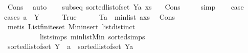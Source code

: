 \begin{isabellebody}
\ Cons{\isacharparenleft}{\kern0pt}{}{\isacharparenright}{\kern0pt}\ \isamarkupfalse%
\ auto\isanewline
\ \ \isamarkupfalse%
\ {}{\isacharcolon}{\kern0pt}{\isachardoublequoteopen}subseq\ {\isacharparenleft}{\kern0pt}sorted{\isacharunderscore}{\kern0pt}list{\isacharunderscore}{\kern0pt}of{\isacharunderscore}{\kern0pt}set\ {\isacharparenleft}{\kern0pt}Y{\isacharminus}{\kern0pt}{\isacharbraceleft}{\kern0pt}a{\isacharbraceright}{\kern0pt}{\isacharparenright}{\kern0pt}{\isacharparenright}{\kern0pt}\ xs{\isachardoublequoteclose}\ \ \isamarkupfalse%
\ Cons{\isacharparenleft}{\kern0pt}{}{\isacharparenright}{\kern0pt}\ {}\ {}\ {}\ \isamarkupfalse%
\ simp\isanewline
\ \ \isamarkupfalse%
\ {\isacharquery}{\kern0pt}case\isanewline
\ \ \isamarkupfalse%
{\isacharparenleft}{\kern0pt}cases\ {\isachardoublequoteopen}a\ {\isasymin}\ Y{\isachardoublequoteclose}{\isacharparenright}{\kern0pt}\isanewline
\ \ \ \ \isamarkupfalse%
\ True\isanewline
\ \ \ \ \isamarkupfalse%
\ T{}{\isacharcolon}{\kern0pt}{\isachardoublequoteopen}a\ {\isacharequal}{\kern0pt}\ min{\isacharunderscore}{\kern0pt}list\ {\isacharparenleft}{\kern0pt}a{\isacharhash}{\kern0pt}xs{\isacharparenright}{\kern0pt}{\isachardoublequoteclose}\ \isamarkupfalse%
\ Cons{\isacharparenleft}{\kern0pt}{}{\isacharcomma}{\kern0pt}{}{\isacharparenright}{\kern0pt}\isanewline
\ \ \ \ \ \ \isamarkupfalse%
\ {\isacharparenleft}{\kern0pt}metis\ List{\isachardot}{\kern0pt}finite{\isacharunderscore}{\kern0pt}set\ Min{\isacharunderscore}{\kern0pt}insert{}\ list{\isachardot}{\kern0pt}distinct{\isacharparenleft}{\kern0pt}{}{\isacharparenright}{\kern0pt}\isanewline
\ \ \ \ \ \ \ \ \ \ list{\isachardot}{\kern0pt}simps{\isacharparenleft}{\kern0pt}{}{}{\isacharparenright}{\kern0pt}\ min{\isacharunderscore}{\kern0pt}list{\isacharunderscore}{\kern0pt}Min\ sorted{\isacharunderscore}{\kern0pt}simps{\isacharparenleft}{\kern0pt}{}{\isacharparenright}{\kern0pt}{\isacharparenright}{\kern0pt}\isanewline
\ \ \ \ \isamarkupfalse%
\ {\isachardoublequoteopen}sorted{\isacharunderscore}{\kern0pt}list{\isacharunderscore}{\kern0pt}of{\isacharunderscore}{\kern0pt}set\ Y\ {\isacharequal}{\kern0pt}\ a\ {\isacharhash}{\kern0pt}\ sorted{\isacharunderscore}{\kern0pt}list{\isacharunderscore}{\kern0pt}of{\isacharunderscore}{\kern0pt}set\ {\isacharparenleft}{\kern0pt}Y{\isacharminus}{\kern0pt}{\isacharbraceleft}{\kern0pt}a{\isacharbraceright}{\kern0pt}{\isacharparenright}{\kern0pt}{\isachardoublequoteclose}\ \isamarkupfalse%

\end{isabellebody}
